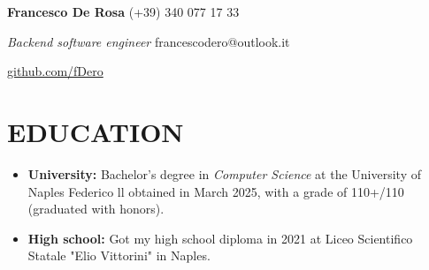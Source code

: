 \documentclass[paper=a4,fontsize=11pt]{scrartcl}
\newcommand{\sepspace}{\vspace*{0.5em}}
\newcommand{\NameEmailPhoneSiteGithub}[4]{
        \Huge \usefont{OT1}{phv}{m}{n} \textbf{#1} 
        \large \usefont{OT1}{phv}{m}{n}             \hfill #2
        
        \textit{Backend software engineer}          \hfill \hspace{25pt} #3 

                                                    \hfill \hspace{25pt} #4 
        \par \normalsize \normalfont
}
\newcommand{\NewPart}[1]{
    \section*{\uppercase{#1}}
}
\begin{document}
\NameEmailPhoneSiteGithub
    {Francesco De Rosa}
    {(+39) 340 077 17 33}
    {francescodero@outlook.it}
    {\href{https://www.github.com/fDero}{github.com/fDero}}
\sepspace


\NewPart{Education}{}
    \begin{itemize}
        \item[\faGraduationCap] 
            \textbf{University:} Bachelor's degree in 
            \textit{Computer Science} at 
            the University of Naples Federico ll obtained in March 2025, with a grade of 110+/110 (graduated with honors).
            
        \item[\faBook] 
            \textbf{High school:} Got my high school 
            diploma in 2021 at Liceo Scientifico 
            Statale "Elio Vittorini" in Naples.
    \end{itemize}
\sepspace
\end{document}
